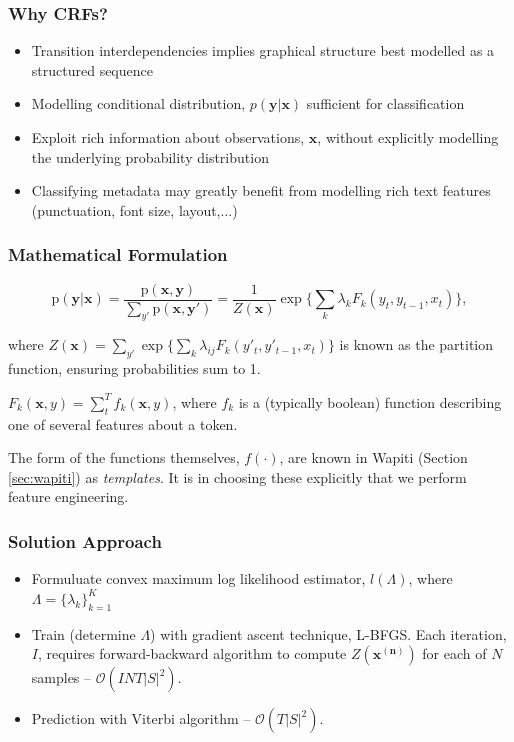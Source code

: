 \documentclass{beamer}
\newcommand{\p}{\text{p}}
\begin{document}

\begin{frame}
\frametitle{Why CRFs?}
\begin{itemize}
\item Transition interdependencies implies graphical structure best modelled as a structured sequence
\item Modelling conditional distribution, $p(\textbf{y}|\textbf{x})$ sufficient for classification
\item Exploit rich information about observations, $\textbf{x}$, without explicitly modelling the underlying probability distribution
\item Classifying metadata may greatly benefit from modelling rich text features (punctuation, font size, layout,...)
\end{itemize}
\end{frame}


\begin{frame}
\frametitle{Mathematical Formulation}
$$
\p(\textbf{y}|\textbf{x}) = \frac{\p(\textbf{x}, \textbf{y})}{\sum_{y'}{\p(\textbf{x}, \textbf{y}')}} = \frac{1}{Z(\mathbf{x})}\exp \Bigg\{\sum_k{
\lambda_{k}F_{k}(y_t, y_{t-1}, x_t)
}\Bigg\},
$$

where $Z(\mathbf{x}) = \sum_{y'}\exp \Big\{\sum_k{\lambda_{ij}F_{k}(y'_t, y'_{t-1}, x_t)}\Big\}$ is known as the partition function, ensuring probabilities sum to 1.

$F_k(\mathbf{x}, y) = \sum_t^T f_k(\mathbf{x}, y)$, where $f_k$ is a (typically boolean) function describing one of several features about a token.

The form of the functions themselves, $f(\cdot)$, are known in Wapiti (Section \ref{sec:wapiti}) as \emph{templates}. It is in choosing these explicitly that we perform feature engineering.
\end{frame}


\begin{frame}
\frametitle{Solution Approach}
\begin{itemize}
\item Formuluate convex maximum log likelihood estimator, $l(\Lambda)$, where $\Lambda = \{\lambda_k\}_{k=1}^K$
\item Train (determine $\Lambda$) with gradient ascent technique, L-BFGS. Each iteration, $I$, requires forward-backward algorithm to compute $Z(\mathbf{x^{(n)}})$ for each of $N$ samples -- $\mathcal{O}(INT|S|^2)$.
\item Prediction with Viterbi algorithm -- $\mathcal{O}(T|S|^2)$.
\end{itemize}
\end{frame}
\end{document}
